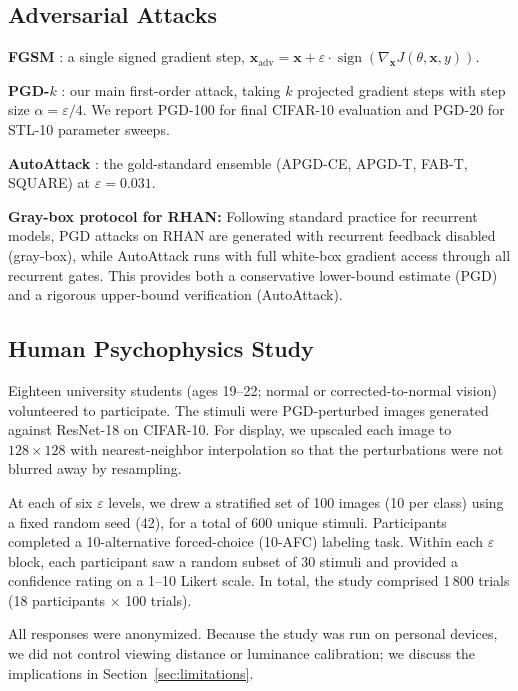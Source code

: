 \documentclass[12pt,a4paper]{article}
\begin{document}
\subsection{Adversarial Attacks}

\textbf{FGSM} \citep{goodfellow2015explaining}: a single signed gradient step,
$\mathbf{x}_{\text{adv}} = \mathbf{x} + \varepsilon \cdot
\operatorname{sign}(\nabla_{\!\mathbf{x}} J(\theta,\mathbf{x},y))$.

\textbf{PGD-$k$} \citep{madry2018towards}: our main first-order attack,
taking $k$ projected gradient steps with step size $\alpha = \varepsilon/4$.
We report PGD-100 for final CIFAR-10 evaluation and PGD-20 for STL-10
parameter sweeps.

\textbf{AutoAttack} \citep{croce2020reliable}: the gold-standard ensemble
(APGD-CE, APGD-T, FAB-T, SQUARE) at $\varepsilon{=}0.031$.

\textbf{Gray-box protocol for RHAN:} Following standard practice for
recurrent models, PGD attacks on RHAN are generated with recurrent feedback
disabled (gray-box), while AutoAttack runs with full white-box gradient access
through all recurrent gates. This provides both a conservative lower-bound
estimate (PGD) and a rigorous upper-bound verification (AutoAttack).

\subsection{Human Psychophysics Study}
\label{sec:human_study}

Eighteen university students (ages 19--22; normal or corrected-to-normal
vision) volunteered to participate. The stimuli were PGD-perturbed images
generated against ResNet-18 on CIFAR-10. For display, we upscaled each
image to $128{\times}128$ with nearest-neighbor interpolation so that the
perturbations were not blurred away by resampling.

At each of six $\varepsilon$ levels, we drew a stratified set of 100 images
(10 per class) using a fixed random seed (42), for a total of 600 unique
stimuli. Participants completed a 10-alternative forced-choice (10-AFC)
labeling task. Within each $\varepsilon$ block, each participant saw a
random subset of 30 stimuli and provided a confidence rating on a 1--10
Likert scale. In total, the study comprised 1\,800 trials
(18 participants $\times$ 100 trials).

All responses were anonymized. Because the study was run on personal devices,
we did not control viewing distance or luminance calibration; we discuss the
implications in Section~\ref{sec:limitations}.
\end{document}
